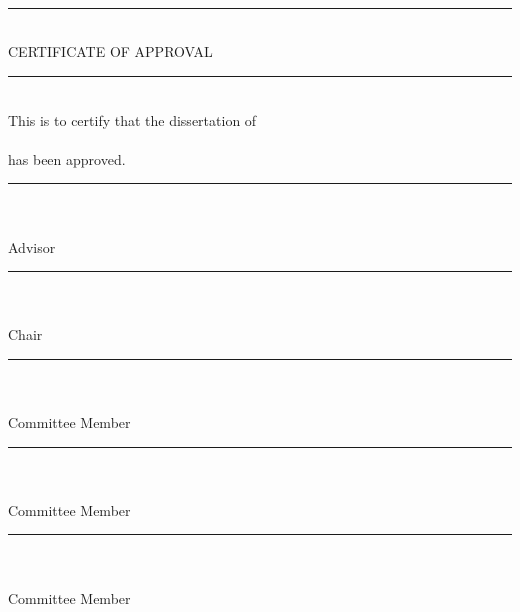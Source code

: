 \vspace*{\fill}
\begin{center}
\track{}\\
\school{}\\
\institution{}\\
\doublespaced
\rule{8cm}{1pt}\\
CERTIFICATE OF APPROVAL\\
\rule{8cm}{1pt}\\
\singlespaced
This is to certify that the \degreeshort{} dissertation of\\
\projectauthor{}\\
has been approved.\\

\vspace{30pt}
\rule{8cm}{0.5pt}\\
\advisor\\
Advisor\\

\vspace{30pt}
\rule{8cm}{0.5pt}\\
\chair\\
Chair\\

\vspace{30pt}
\rule{8cm}{0.5pt}\\
\memberthree\\
Committee Member\\

\vspace{30pt}
\rule{8cm}{0.5pt}\\
\memberfour\\
Committee Member\\

\vspace{30pt}
\rule{8cm}{0.5pt}\\
\memberfive\\
Committee Member\\

\end{center}
\vspace*{\fill}
\clearpage